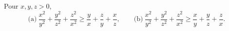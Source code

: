 Pour $x, y, z > 0$,
\[ \text{(a)}\ \frac{x^2}{y^2} + \frac{y^2}{z^2} + \frac{z^2}{x^2} \geq \frac{y}{x} + \frac{z}{y} + \frac{x}{z},\qquad \text{(b)}\ \frac{x^2}{y^2} + \frac{y^2}{z^2} + \frac{z^2}{x^2} \geq \frac{x}{y} + \frac{y}{z} + \frac{z}{x}. \]

